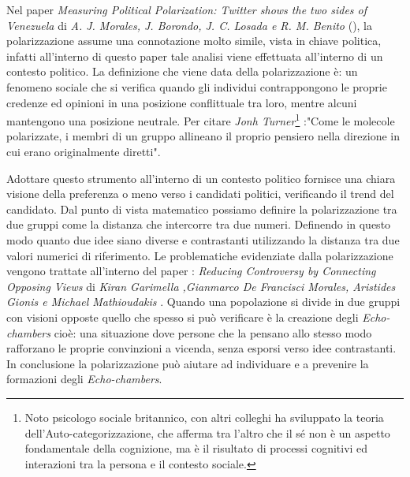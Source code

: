 Nel paper \textit{Measuring Political Polarization: Twitter shows the two sides of Venezuela} di \textit{A. J. Morales, J. Borondo, J. C. Losada e R. M. Benito} (\cite{morales2015polarization}), la polarizzazione assume una connotazione molto simile, vista in chiave politica, infatti all'interno di questo paper tale analisi viene effettuata all'interno di un contesto politico. 
La definizione che viene data della polarizzazione è: 
un fenomeno sociale che si verifica quando gli individui contrappongono le proprie credenze ed opinioni in una posizione conflittuale tra loro, mentre alcuni mantengono una posizione neutrale.
Per citare \textit{Jonh Turner}\footnote{Noto psicologo sociale britannico, con altri colleghi ha sviluppato la teoria dell'Auto-categorizzazione, che afferma tra l'altro che il sé non è un aspetto fondamentale della cognizione, ma è il risultato di processi cognitivi ed interazioni tra la persona e il contesto sociale.} :"Come le molecole polarizzate, i membri di un gruppo allineano il proprio pensiero nella direzione in cui erano originalmente diretti". 

Adottare questo strumento all'interno di un contesto politico fornisce una chiara visione della preferenza o meno verso i candidati politici, verificando il trend del candidato.
Dal punto di vista matematico possiamo definire la polarizzazione tra due gruppi come la distanza che intercorre tra due numeri. Definendo in questo modo quanto due idee siano diverse e contrastanti utilizzando la distanza tra due valori numerici di riferimento.
Le problematiche evidenziate dalla polarizzazione vengono trattate all'interno del paper : \textit{Reducing Controversy by Connecting Opposing Views} di \textit{Kiran Garimella ,Gianmarco De Francisci Morales, Aristides Gionis e Michael Mathioudakis} \cite{Garimella2015polarization}. Quando una popolazione si divide in due gruppi con visioni opposte quello che spesso si può verificare è la creazione degli \textit{Echo-chambers} cioè: una situazione dove persone che la pensano allo stesso modo rafforzano le proprie convinzioni a vicenda, senza esporsi verso idee contrastanti.
In conclusione la polarizzazione può aiutare ad individuare e a prevenire la formazioni degli \textit{Echo-chambers}.

